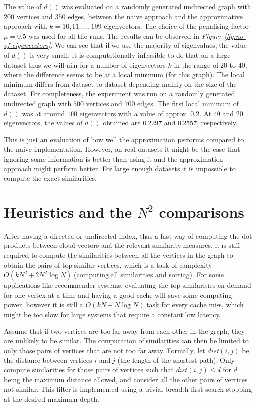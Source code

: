 \documentclass[12pt]{report}
\begin{document}
The value of $d()$ was evaluated on a randomly generated undirected graph with
$200$ vertices and $350$ edges, between the naive approach
and the approximative approach with $k = 10, 11, \dots, 199$ eigenvectors. The
choice of the penalising factor $\mu=0.5$ was used for all the runs. The results
can be observed in \emph{Figure~\ref{fig:no-of-eigenvectors}}. We can see that
if we use the majority of eigenvalues, the value of $d()$ is very small. It is
computationally infeasible to do that on a large dataset thus we will aim for a
number of eigenvectors $k$ in the range of $20$ to $40$, where the difference
seems to be at a local minimum (for this graph). The local minimum differs from
dataset to dataset depending mainly on the size of the dataset. For completeness,
the experiment was run on a randomly generated undirected graph with $500$
vertices and $700$ edges. The first local minimum of $d()$ was at around $100$
eigenvectors with a value of approx. $0.2$. At $40$ and $20$ eigenvectors, the
values of $d()$ obtained are $0.2297$ and $0.2557$, respectively.


This is just an evaluation of how well the approximation performs compared to
the naive implementation. However, on real datasets it might be the case that
ignoring some information is better than using it and the approximation approach
might perform better. For large enough datasets it is impossible to compute the
exact similarities.

%
%

\section{Heuristics and the $N^2$ comparisons}

After having a directed or undirected index, thus a fast way of computing the
dot products between cloud vectors and the relevant similarity measures, it is
still required to compute the similarities between all the vertices in the graph
to obtain the pairs of top similar vertices, which is a task of complexity
$O(kN^2+2N^2\log N)$ (computing all similarities and sorting). For some
applications like recommender systems, evaluating the top similarities on demand
for one vertex at a time and having a good cache will save some computing power,
however it is still a $O(kN+N\log N)$ task for every cache miss, which might be
too slow for large systems that require a constant low latency.


Assume that if two vertices are too far away from each other in the graph, they
are unlikely to be similar. The computation of similarities can then be limited
to only those pairs of vertices that are not too far away. Formally, let
$dist(i,j)$ be the distance between vertices $i$ and $j$ (the length of the
shortest path). Only compute similarities for those pairs of vertices such that
$dist(i, j) \leq d$ for $d$ being the maximum distance allowed, and consider all
the other pairs of vertices not similar. This filter is implemented using a
trivial breadth first search stopping at the desired maximum depth.
\end{document}
